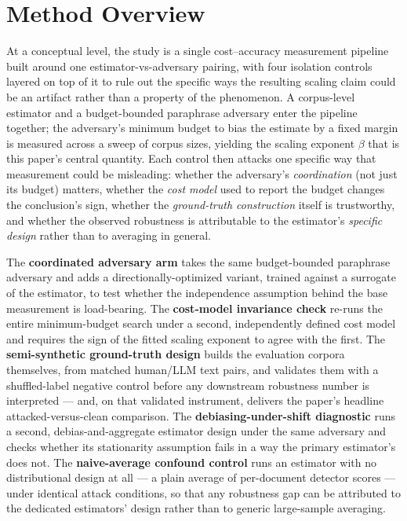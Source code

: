 \documentclass[11pt]{article}
\begin{document}
\section{Method Overview}

At a conceptual level, the study is a single cost--accuracy measurement pipeline built around one estimator-vs-adversary pairing, with four isolation controls layered on top of it to rule out the specific ways the resulting scaling claim could be an artifact rather than a property of the phenomenon. A corpus-level estimator and a budget-bounded paraphrase adversary enter the pipeline together; the adversary's minimum budget to bias the estimate by a fixed margin is measured across a sweep of corpus sizes, yielding the scaling exponent $\beta$ that is this paper's central quantity. Each control then attacks one specific way that measurement could be misleading: whether the adversary's \emph{coordination} (not just its budget) matters, whether the \emph{cost model} used to report the budget changes the conclusion's sign, whether the \emph{ground-truth construction} itself is trustworthy, and whether the observed robustness is attributable to the estimator's \emph{specific design} rather than to averaging in general.

The \textbf{coordinated adversary arm} takes the same budget-bounded paraphrase adversary and adds a directionally-optimized variant, trained against a surrogate of the estimator, to test whether the independence assumption behind the base measurement is load-bearing. The \textbf{cost-model invariance check} re-runs the entire minimum-budget search under a second, independently defined cost model and requires the sign of the fitted scaling exponent to agree with the first. The \textbf{semi-synthetic ground-truth design} builds the evaluation corpora themselves, from matched human/LLM text pairs, and validates them with a shuffled-label negative control before any downstream robustness number is interpreted --- and, on that validated instrument, delivers the paper's headline attacked-versus-clean comparison. The \textbf{debiasing-under-shift diagnostic} runs a second, debias-and-aggregate estimator design under the same adversary and checks whether its stationarity assumption fails in a way the primary estimator's does not. The \textbf{naive-average confound control} runs an estimator with no distributional design at all --- a plain average of per-document detector scores --- under identical attack conditions, so that any robustness gap can be attributed to the dedicated estimators' design rather than to generic large-sample averaging.
\end{document}
